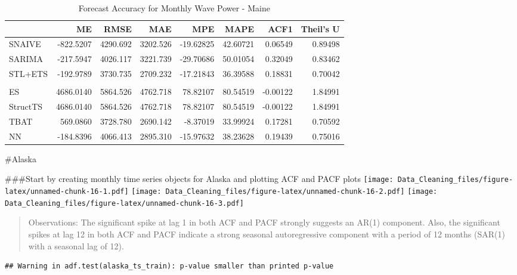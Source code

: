 \documentclass[
]{article}
\begin{document}
\begin{table}[!h]
\centering\centering
\caption{\label{tab:unnamed-chunk-15}Forecast Accuracy for Monthly Wave Power - Maine}
\centering
\begin{tabular}[t]{l|r|r|r|r|r|r|r}
\hline
  & ME & RMSE & MAE & MPE & MAPE & ACF1 & Theil's U\\
\hline
SNAIVE & -822.5207 & 4290.692 & 3202.526 & -19.62825 & 42.60721 & 0.06549 & 0.89498\\
\hline
SARIMA & -217.5947 & 4026.117 & 3221.739 & -29.70686 & 50.01054 & 0.32049 & 0.83462\\
\hline
STL+ETS & -192.9789 & 3730.735 & 2709.232 & -17.21843 & 36.39588 & 0.18831 & 0.70042\\
\hline
\cellcolor{gray!10}{ARIMA+Fourier} & \cellcolor{gray!10}{736.3832} & \cellcolor{gray!10}{3690.025} & \cellcolor{gray!10}{2601.569} & \cellcolor{gray!10}{-5.30294} & \cellcolor{gray!10}{31.99013} & \cellcolor{gray!10}{0.20083} & \cellcolor{gray!10}{0.72561}\\
\hline
ES & 4686.0140 & 5864.526 & 4762.718 & 78.82107 & 80.54519 & -0.00122 & 1.84991\\
\hline
StructTS & 4686.0140 & 5864.526 & 4762.718 & 78.82107 & 80.54519 & -0.00122 & 1.84991\\
\hline
TBAT & 569.0860 & 3728.780 & 2690.142 & -8.37019 & 33.99924 & 0.17281 & 0.70592\\
\hline
NN & -184.8396 & 4066.413 & 2895.310 & -15.97632 & 38.23628 & 0.19439 & 0.75016\\
\hline
\end{tabular}
\end{table}

\#Alaska

\#\#\#Start by creating monthly time series objects for Alaska and
plotting ACF and PACF plots
\texttt{[image: Data\_Cleaning\_files/figure-latex/unnamed-chunk-16-1.pdf]}
\texttt{[image: Data\_Cleaning\_files/figure-latex/unnamed-chunk-16-2.pdf]}
\texttt{[image: Data\_Cleaning\_files/figure-latex/unnamed-chunk-16-3.pdf]}

\begin{quote}
Observations: The significant spike at lag 1 in both ACF and PACF
strongly suggests an AR(1) component. Also, the significant spikes at
lag 12 in both ACF and PACF indicate a strong seasonal autoregressive
component with a period of 12 months (SAR(1) with a seasonal lag of 12).
\end{quote}

\begin{verbatim}
## Warning in adf.test(alaska_ts_train): p-value smaller than printed p-value
\end{verbatim}
\end{document}
